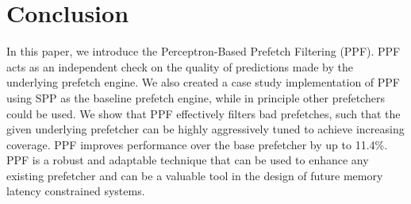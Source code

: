 \section{Conclusion}
\label{Conclusion}
In this paper, we introduce the Perceptron-Based Prefetch Filtering
(PPF).  PPF acts as an independent check on the quality of predictions
made by the underlying prefetch engine.  We also created a case study
implementation of PPF using SPP as the baseline prefetch engine, while
in principle other prefetchers could be used.  We show that PPF
effectively filters bad prefetches, such that the given underlying
prefetcher can be highly aggressively tuned to achieve increasing
coverage.  PPF improves performance over the base prefetcher by up to
11.4\%.  PPF is a robust and adaptable technique that can be used to
enhance any existing prefetcher and can be a valuable tool in the
design of future memory latency constrained systems.
